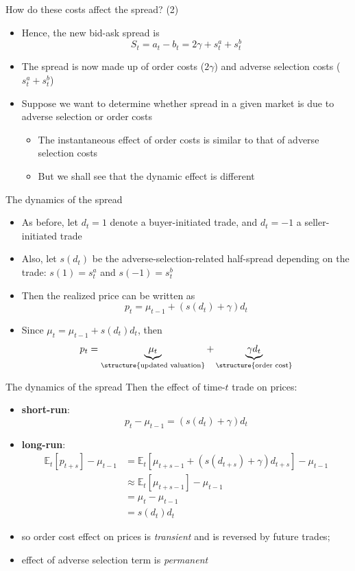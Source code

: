 \documentclass[english,10pt]{beamer}
\begin{document}
\begin{frame}{How do these costs affect the spread? (2)}
	\begin{itemize}
		\item  Hence, the new bid-ask spread is 
		\[
		S_{t} = a_{t} - b_{t} = 2\gamma +s^{a}_{t}  + s^{b}_{t}
		\]
		\item The spread is now made up of order costs ($2\gamma$) and adverse selection costs ($s^{a}_{t}  + s^{b}_{t}$)
		\item Suppose we want to determine whether spread in a given market is due to adverse selection or order costs
		\begin{itemize}
			\item The instantaneous effect of order costs is similar to that of adverse selection costs
			\item But we shall see that the dynamic effect is different
		\end{itemize}
	\end{itemize}
\end{frame}


\begin{frame}{The dynamics of the spread}
	\begin{itemize}
		\item As before, let $d_{t}=1$ denote a buyer-initiated trade, and $d_{t} = -1$ a seller-initiated trade
		\item Also, let $s(d_{t})$ be the adverse-selection-related half-spread depending on the trade: $s(1)=s^{a}_{t}$ and $s(-1)=s^{b}_{t}$
		\item Then the realized price can be written as
		\[
		p_{t} = \mu_{t-1} + (s(d_{t}) + \gamma) d_{t}
		\]
		\item Since $\mu_{t} = \mu_{t-1} + s(d_{t}) d_{t}$, then
		\[
		p_{t}  = \underbrace{\mu_{t}}_{\structure{\text{updated valuation}}} + \underbrace{\gamma d_{t}}_{\structure{\text{order cost}}}
		\]
	\end{itemize}
\end{frame}


\begin{frame}{The dynamics of the spread}
	Then the effect of time-$t$ trade on prices:
	\begin{itemize}
		\item \textbf{short-run}: $$p_t - \mu_{t-1} = (s(d_{t}) + \gamma) d_{t}$$
		\item \textbf{long-run}:
		\begin{align*}
			\mathbb{E}_t [p_{t+s}] - \mu_{t-1} &= \mathbb{E}_t [\mu_{t+s-1} + (s(d_{t+s}) + \gamma) d_{t+s}] - \mu_{t-1}
			\\
			&\approx \mathbb{E}_t [\mu_{t+s-1}] - \mu_{t-1}
			\\
			&= \mu_t - \mu_{t-1}
			\\
			&= s(d_t) d_t
		\end{align*}
		\item so order cost effect on prices is \emph{transient} and is reversed by future trades;
		\item effect of adverse selection term is \emph{permanent}
	\end{itemize}
\end{frame}
\end{document}
